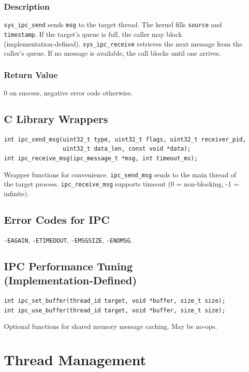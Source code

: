 \documentclass[12pt,a4paper]{article}
\begin{document}
\subsubsection{Description}
\texttt{sys\_ipc\_send} sends \texttt{msg} to the target thread. The kernel fills \texttt{source} and \texttt{timestamp}. If the target's queue is full, the caller may block (implementation‑defined). \texttt{sys\_ipc\_receive} retrieves the next message from the caller's queue. If no message is available, the call blocks until one arrives.

\subsubsection{Return Value}
0 on success, negative error code otherwise.

\subsection{C Library Wrappers}
\begin{lstlisting}
int ipc_send_msg(uint32_t type, uint32_t flags, uint32_t receiver_pid,
                 uint32_t data_len, const void *data);
int ipc_receive_msg(ipc_message_t *msg, int timeout_ms);
\end{lstlisting}
Wrapper functions for convenience. \texttt{ipc\_send\_msg} sends to the main thread of the target process. \texttt{ipc\_receive\_msg} supports timeout (0 = non‑blocking, -1 = infinite).

\subsection{Error Codes for IPC}
\texttt{-EAGAIN}, \texttt{-ETIMEDOUT}, \texttt{-EMSGSIZE}, \texttt{-ENOMSG}.

\subsection{IPC Performance Tuning (Implementation‑Defined)}
\begin{lstlisting}
int ipc_set_buffer(thread_id target, void *buffer, size_t size);
int ipc_use_buffer(thread_id target, void *buffer, size_t size);
\end{lstlisting}
Optional functions for shared memory message caching. May be no‑ops.

\section{Thread Management}
\label{sec:threads}
\end{document}
